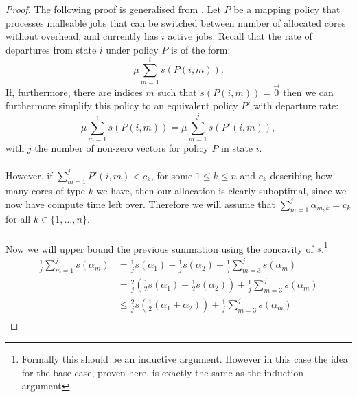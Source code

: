 \begin{proof}
    The following proof is generalised from \cite[7]{10.1145/3154499}. Let $P$ be a mapping policy that processes malleable jobs that can be switched between number of allocated cores without overhead, and currently has $i$ active jobs. Recall that the rate of departures from state $i$ under policy $P$ is of the form:
    \begin{equation*}
    \mu \sum_{m=1}^i s(P(i,m)). \label{eq:rate_of_departures}
    \end{equation*}
    If, furthermore, there are indices $m$ such that $s(P(i,m)) = \vec{0}$ then we can furthermore simplify this policy to an equivalent policy $P'$ with departure rate:
    $$\mu \sum_{m=1}^i s(P(i,m)) = \mu \sum_{m=1}^j s(P'(i,m)),$$
    with $j$ the number of non-zero vectors for policy $P$ in state $i$.
    \\\\
    However, if $\sum_{m=1}^j P'(i,m) < c_k$, for some $1 \leq k \leq n$ and $c_k$ describing how many cores of type $k$ we have, then our allocation is clearly suboptimal, since we now have compute time left over. Therefore we will assume that $\sum_{m=1}^j\alpha_{m,k} = c_k$ for all $k \in \{1,\dots,n\}$.
    \\\\
    Now we will upper bound the previous summation using the concavity of $s$.\footnote{Formally this should be an inductive argument. However in this case the idea for the base-case, proven here, is exactly the same as the induction argument}
    \begin{align*}
        \frac{1}{j}\sum_{m=1}^j s (\alpha_m) &= \frac{1}{j} s(\alpha_1) + \frac{1}{j} s(\alpha_2) + \frac{1}{j}\sum_{m=3}^j s (\alpha_m)\\
        &= \frac{2}{j}\left(\frac{1}{2} s(\alpha_1) + \frac{1}{2} s(\alpha_2)\right) + \frac{1}{j}\sum_{m=3}^j s (\alpha_m)\\
        &\leq \frac{2}{j}s\left(\frac{1}{2} (\alpha_1 + \alpha_2)\right) + \frac{1}{j}\sum_{m=3}^j s (\alpha_m)\\

\end{align*}
\end{proof}
